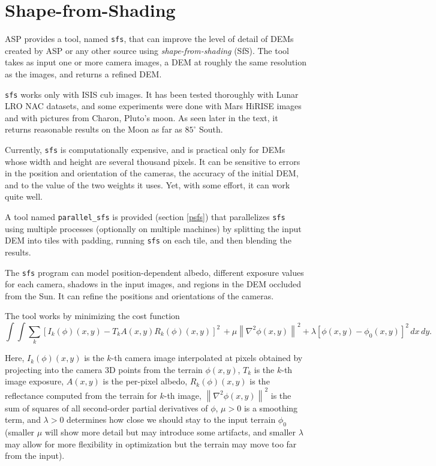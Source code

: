 \chapter{Shape-from-Shading}
\label{ch:sfs}

ASP provides a tool, named \texttt{sfs}, that can improve the level of
detail of DEMs created by ASP or any other source using
\textit{shape-from-shading} (SfS). The tool takes as input one or more
camera images, a DEM at roughly the same resolution as the images, and
returns a refined DEM.

\texttt{sfs} works only with ISIS cub images. It has been tested
thoroughly with Lunar LRO NAC datasets, and some experiments were done
with Mars HiRISE images and with pictures from Charon, Pluto's moon. As
seen later in the text, it returns reasonable results on the Moon as far
as $85^\circ$ South.

Currently, \texttt{sfs} is computationally expensive, and is practical
only for DEMs whose width and height are several thousand pixels. It can be 
sensitive to errors in the position and orientation of the cameras, the
accuracy of the initial DEM, and to the value of the two weights it uses.
Yet, with some effort, it can work quite well. 

A tool named \texttt{parallel\_sfs} is provided (section \ref{psfs}) 
that parallelizes \texttt{sfs} using multiple processes (optionally on
multiple machines) by splitting the input DEM into tiles with padding,
running \texttt{sfs} on each tile, and then blending the results. 

The \texttt{sfs} program can model position-dependent albedo, different
exposure values for each camera, shadows in the input images, and regions
in the DEM occluded from the Sun. It can refine the positions and orientations
of the cameras.

The tool works by minimizing the cost function
\begin{equation}\label{cost}
\int\!\! \int \! \sum_k \left[ I_k(\phi)(x, y) - T_k A(x, y)
 R_k(\phi)(x, y) \right]^2\,  
+ \mu \left\|\nabla^2 \phi(x, y) \right\|^2  
+ \lambda  \left[ \phi(x, y) - \phi_0(x, y) \right]^2
\, dx\, dy.
\end{equation}

Here, $I_k(\phi)(x, y)$ is the $k$-th camera image interpolated at
pixels obtained by projecting into the camera 3D points from the terrain
$\phi(x, y)$, $T_k$ is the $k$-th image exposure, $A(x, y)$ is the
per-pixel albedo, $R_k(\phi)(x, y)$ is the reflectance computed from the
terrain for $k$-th image, $\left\|\nabla^2 \phi(x, y) \right\|^2 $ is the sum
of squares of all second-order partial derivatives of $\phi$, $\mu > 0$
is a smoothing term, and $\lambda > 0$ determines how close we should
stay to the input terrain $\phi_0$ (smaller $\mu$ will show more detail
but may introduce some artifacts, and smaller $\lambda$ may allow for
more flexibility in optimization but the terrain may move too far from the input). 

